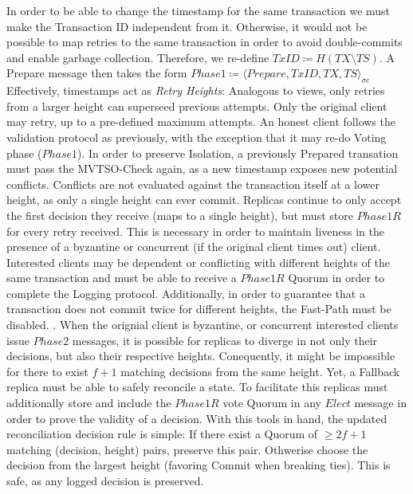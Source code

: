 In order to be able to change the timestamp for the same transaction we must make the Transaction ID independent from it. Otherwise, it would not be possible to map retries to the same transaction in order to avoid double-commits and enable garbage collection.
Therefore, we re-define $TxID \coloneqq H(TX \setminus TS)$. A Prepare message then takes the form $Phase1 \coloneqq \langle Prepare, TxID, TX, TS \rangle_{\sigma c}$
Effectively, timestamps act as \textit{Retry Heights}: Analogous to views, only retries from a larger height can superseed previous attempts. Only the original client may retry, up to a pre-defined maximum attempts.
An honest client follows the validation protocol as previously, with the exception that it may re-do Voting phase ($Phase1$). In order to preserve Isolation, a previously Prepared transation must pass the MVTSO-Check again, as a new timestamp exposes new potential conflicts. Conflicts are not evaluated against the transaction itself at a lower height, as only a single height can ever commit.
Replicas continue to only accept the first decision they receive (maps to a single height), but must store $Phase1R$ for every retry received. This is necessary in order to maintain liveness in the presence of a byzantine or concurrent (if the original client times out) client. Interested clients may be dependent or conflicting with different heights of the same transaction and must be able to receive a $Phase1R$ Quorum in order to complete the Logging protocol. Additionally, in order to guarantee that a transaction does not commit twice for different heights, the Fast-Path must be disabled. . When the orignial client is byzantine, or concurrent interested clients issue $Phase2$ messages, it is possible for replicas to diverge in not only their decisions, but also their respective heights. Conequently, it might be impossible for there to exist $f+1$ matching decisions from the same height. Yet, a Fallback replica must be able to safely reconcile a state. To facilitate this replicas must additionally store and include the $Phase1R$ vote Quorum in any $Elect$ message in order to prove the validity of a decision. 
With this tools in hand, the updated reconciliation decision rule is simple: If there exist a Quorum of $\geq 2f+1$ matching (decision, height) pairs, preserve this pair. Othwerise choose the decision from the largest height (favoring Commit when breaking ties). This is safe, as any logged decision is preserved.


